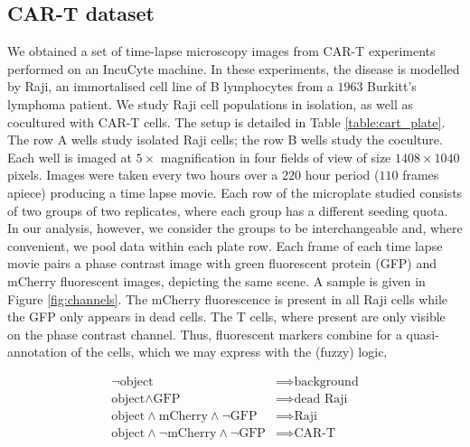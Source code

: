 \subsection{CAR-T dataset}

We obtained a set of time-lapse microscopy images from CAR-T experiments performed on an IncuCyte machine. In these experiments, the disease is modelled by Raji, an immortalised cell line of B lymphocytes from a $1963$ Burkitt's lymphoma patient. We study Raji cell populations in isolation, as well as cocultured with CAR-T cells. The setup is detailed in Table \ref{table:cart_plate}. The row A wells study isolated Raji cells; the row B wells study the coculture. Each well is imaged at $5\times$ magnification in four fields of view of size $1408\times1040$ pixels. Images were taken every two hours over a $220$ hour period ($110$ frames apiece) producing a time lapse movie. Each row of the microplate studied consists of two groups of two replicates, where each group has a different seeding quota. In our analysis, however, we consider the groups to be interchangeable and, where convenient, we pool data within each plate row. Each frame of each time lapse movie pairs a phase contrast image with green fluorescent protein (GFP) and mCherry fluorescent images, depicting the same scene. A sample is given in Figure \ref{fig:channels}. The mCherry fluorescence is present in all Raji cells while the GFP only appears in dead cells. The T cells, where present are only visible on the phase contrast channel. Thus, fluorescent markers combine for a quasi-annotation of the cells, which we may express with the (fuzzy) logic,

\begin{align}
\lnot \text{object} &\implies \text{background} \label{eq:fuzzy_logic} \\
\text{object} \land \text{GFP} &\implies \text{dead Raji} \nonumber \\
\text{object} \land \text{mCherry} \land \lnot \text{GFP} &\implies \text{Raji} \nonumber \\
\text{object} \land \lnot \text{mCherry} \land \lnot \text{GFP} &\implies \text{CAR-T} \nonumber
\end{align}

